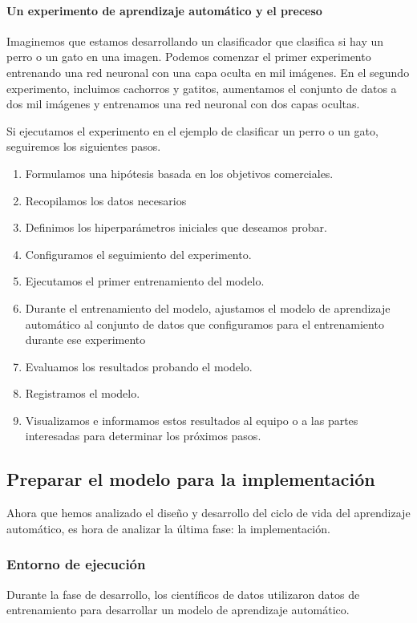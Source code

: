 \documentclass[10pt]{book}
\begin{document}
\paragraph{Un experimento de aprendizaje automático y el preceso}
Imaginemos que estamos desarrollando un clasificador que clasifica si hay un perro o un gato en una imagen. Podemos comenzar el primer experimento entrenando una red neuronal con una capa oculta en mil imágenes. En el segundo experimento, incluimos cachorros y gatitos, aumentamos el conjunto de datos a dos mil imágenes y entrenamos una red neuronal con dos capas ocultas.

Si ejecutamos el experimento en el ejemplo de clasificar un perro o un gato, seguiremos los siguientes pasos.
\begin{enumerate}
    \item Formulamos una hipótesis basada en los objetivos comerciales.
    \item Recopilamos los datos necesarios 
    \item Definimos los hiperparámetros iniciales que deseamos probar.
    \item Configuramos el seguimiento del experimento.
    \item Ejecutamos el primer entrenamiento del modelo.
    \item Durante el entrenamiento del modelo, ajustamos el modelo de aprendizaje automático al conjunto de datos que configuramos para el entrenamiento durante ese experimento
    \item Evaluamos los resultados probando el modelo.
    \item Registramos el modelo.
    \item Visualizamos e informamos estos resultados al equipo o a las partes interesadas para determinar los próximos pasos.
\end{enumerate}


\subsection{Preparar el modelo para la implementación}
Ahora que hemos analizado el diseño y desarrollo del ciclo de vida del aprendizaje automático, es hora de analizar la última fase: la implementación.

\subsubsection{Entorno de ejecución}
Durante la fase de desarrollo, los científicos de datos utilizaron datos de entrenamiento para desarrollar un modelo de aprendizaje automático.
\end{document}
